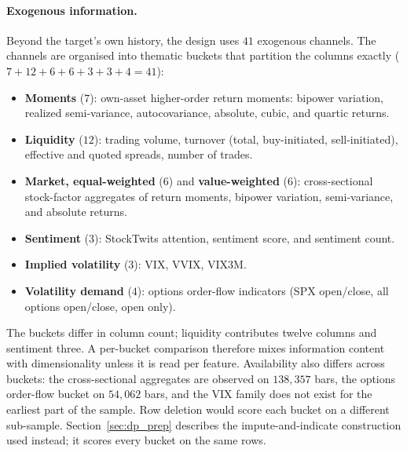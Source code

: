 \paragraph{Exogenous information.}
Beyond the target's own history, the design uses $41$ exogenous channels.
The channels are organised into thematic buckets that partition the
columns exactly ($7+12+6+6+3+3+4 = 41$):
\begin{itemize}
    \item \textbf{Moments} ($7$): own-asset higher-order return moments:
      bipower variation, realized semi-variance, autocovariance, absolute,
      cubic, and quartic returns.
    \item \textbf{Liquidity} ($12$): trading volume, turnover (total,
      buy-initiated, sell-initiated), effective and quoted spreads, number
      of trades.
    \item \textbf{Market, equal-weighted} ($6$) and \textbf{value-weighted}
      ($6$): cross-sectional stock-factor aggregates of return moments,
      bipower variation, semi-variance, and absolute returns.
    \item \textbf{Sentiment} ($3$): StockTwits attention, sentiment score,
      and sentiment count.
    \item \textbf{Implied volatility} ($3$): VIX, VVIX, VIX3M.
    \item \textbf{Volatility demand} ($4$): options order-flow indicators
      (SPX open/close, all options open/close, open only).
\end{itemize}
The buckets differ in column count; liquidity contributes twelve columns
and sentiment three. A per-bucket comparison therefore mixes information
content with dimensionality unless it is read per feature. Availability
also differs across buckets: the cross-sectional aggregates are observed
on $138{,}357$ bars, the options order-flow bucket on $54{,}062$ bars, and
the VIX family does not exist for the earliest part of the sample. Row
deletion would score each bucket on a different sub-sample.
Section~\ref{sec:dp_prep} describes the impute-and-indicate construction
used instead; it scores every bucket on the same rows.


